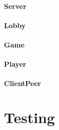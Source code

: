 \documentclass[12pt, letterpaper]{article}
\begin{document}

    \paragraph{Server}

    \paragraph{Lobby}

    \paragraph{Game}

    \paragraph{Player}

    \paragraph{ClientPeer}


    \section{Testing}
    \label{sec:testing}


\end{document}
